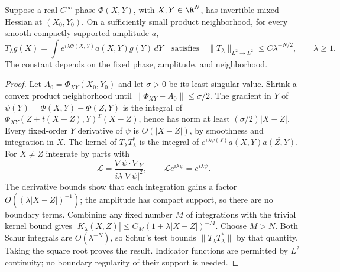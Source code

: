 \begin{lemma}\label{lem:oscillatory}
Suppose a real $C^\infty$ phase $\Phi(X,Y)$, with $X,Y\in\R^N$, has
invertible mixed Hessian at $(X_0,Y_0)$. On a sufficiently small product
neighborhood, for every smooth compactly supported amplitude $a$,
\[
 T_\lambda g(X)=\int e^{i\lambda\Phi(X,Y)}a(X,Y)g(Y)\,dY
 \quad\text{satisfies}\quad
 \|T_\lambda\|_{L^2\to L^2}\le C\lambda^{-N/2},\qquad\lambda\ge1.
\]
The constant depends on the fixed phase, amplitude, and neighborhood.
\end{lemma}
\begin{proof}
Let $A_0=\Phi_{XY}(X_0,Y_0)$ and let $\sigma>0$ be its least singular
value. Shrink a convex product neighborhood until
$\|\Phi_{XY}-A_0\|\le\sigma/2$. The gradient in $Y$ of
$\psi(Y)=\Phi(X,Y)-\Phi(Z,Y)$ is the integral of
$\Phi_{XY}(Z+t(X-Z),Y)^T(X-Z)$, hence has norm at least
$(\sigma/2)|X-Z|$. Every fixed-order $Y$ derivative of $\psi$ is
$O(|X-Z|)$, by smoothness and integration in $X$.
The kernel of $T_\lambda T_\lambda^*$ is the integral of
$e^{i\lambda\psi(Y)}a(X,Y)\overline{a(Z,Y)}$. For $X\ne Z$ integrate
by parts with
\[
 \mathcal L=\frac{\nabla\psi\cdot\nabla_Y}
                  {i\lambda|\nabla\psi|^2},
 \qquad \mathcal L e^{i\lambda\psi}=e^{i\lambda\psi}.
\]
The derivative bounds show that each integration gains a factor
$O((\lambda|X-Z|)^{-1})$; the amplitude has compact support, so there
are no boundary terms. Combining any fixed number $M$ of integrations
with the trivial kernel bound gives
$|K_\lambda(X,Z)|\le C_M(1+\lambda|X-Z|)^{-M}$.
Choose $M>N$. Both Schur integrals are $O(\lambda^{-N})$, so Schur's
test bounds $\|T_\lambda T_\lambda^*\|$ by that quantity. Taking the
square root proves the result. Indicator functions are permitted by
$L^2$ continuity; no boundary regularity of their support is needed.
\end{proof}

